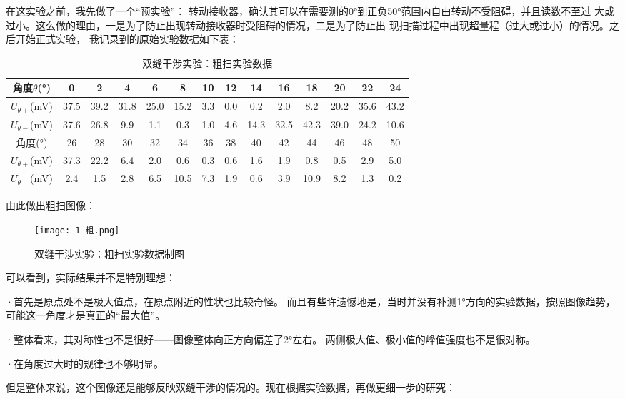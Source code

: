 \documentclass[11pt]{article}
\begin{document}
在这实验之前，我先做了一个“预实验”：
转动接收器，确认其可以在需要测的0°到正负50°范围内自由转动不受阻碍，并且读数不至过
大或过小。这么做的理由，一是为了防止出现转动接收器时受阻碍的情况，二是为了防止出
现扫描过程中出现超量程（过大或过小）的情况。之后开始正式实验，
我记录到的原始实验数据如下表：
\begin{table}[H]
    \centering
    \begin{tabular}{cccccccccccccc}
    \toprule
        角度$\theta$(°) & 0 & 2 & 4 & 6 & 8 & 10 & 12 & 14 & 16 & 18 & 20 & 22 & 24 \\ \midrule
        $U_{\theta+}$(mV) & 37.5  & 39.2  & 31.8  & 25.0  & 15.2  & 3.3  & 0.0  & 0.2  & 2.0  & 8.2  & 20.2  & 35.6  & 43.2  \\ 
       $U_{\theta-}$(mV)& 37.6  & 26.8  & 9.9  & 1.1  & 0.3  & 1.0  & 4.6  & 14.3  & 32.5  & 42.3  & 39.0  & 24.2  & 10.6  \\ 
       \bottomrule \toprule
        角度(°) & 26 & 28 & 30 & 32 & 34 & 36 & 38 & 40 & 42 & 44 & 46 & 48 & 50 \\ \midrule
        $U_{\theta+}$(mV) & 37.3  & 22.2  & 6.4  & 2.0  & 0.6  & 0.3  & 0.6  & 1.6  & 1.9  & 0.8  & 0.5  & 2.9  & 5.0  \\ 
        $U_{\theta-}$(mV) & 2.4  & 1.5  & 2.8  & 6.5  & 10.5  & 7.3  & 1.9  & 0.6  & 3.9  & 10.9  & 8.2  & 1.3  & 0.2 \\ \bottomrule
    \end{tabular}
    \caption{双缝干涉实验：粗扫实验数据}
\end{table}

由此做出粗扫图像：

\begin{figure}[H]
    \centering
    \texttt{[image: 1 粗.png]}
    \caption{双缝干涉实验：粗扫实验数据制图}
\end{figure}


可以看到，实际结果并不是特别理想：

·首先是原点处不是极大值点，在原点附近的性状也比较奇怪。
而且有些许遗憾地是，当时并没有补测1°方向的实验数据，按照图像趋势，可能这一角度才是真正的“最大值”。

·整体看来，其对称性也不是很好——图像整体向正方向偏差了2°左右。
两侧极大值、极小值的峰值强度也不是很对称。

·在角度过大时的规律也不够明显。


\newpage
但是整体来说，这个图像还是能够反映双缝干涉的情况的。现在根据实验数据，再做更细一步的研究：
\end{document}
